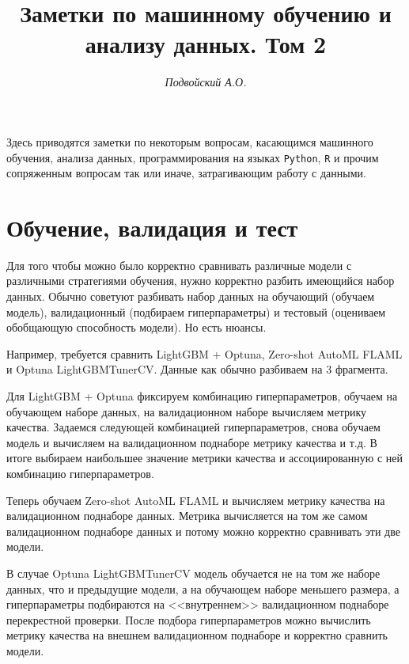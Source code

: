 \documentclass[%
	11pt,
	a4paper,
	utf8,
		]{article}
\begin{document}
\title{Заметки по машинному обучению и анализу данных. Том 2}

\author{\itshape Подвойский А.О.}

\date{}
\maketitle

\thispagestyle{fancy}

Здесь приводятся заметки по некоторым вопросам, касающимся машинного обучения, анализа данных, программирования на языках \texttt{Python}, \texttt{R} и прочим сопряженным вопросам так или иначе, затрагивающим работу с данными.



\tableofcontents

\section{Обучение, валидация и тест}

Для того чтобы можно было корректно сравнивать различные модели с различными стратегиями обучения, нужно корректно разбить имеющийся набор данных. Обычно советуют разбивать набор данных на обучающий (обучаем модель), валидационный (подбираем гиперпараметры) и тестовый (оцениваем обобщающую способность модели). Но есть нюансы.

Например, требуется сравнить LightGBM + Optuna, Zero-shot AutoML FLAML и Optuna LightGBMTunerCV. Данные как обычно разбиваем на 3 фрагмента. 

Для LightGBM + Optuna фиксируем комбинацию гиперпараметров, обучаем на обучающем наборе данных, на валидационном наборе вычисляем метрику качества. Задаемся следующей комбинацией гиперпараметров, снова обучаем модель и вычисляем на валидационном поднаборе метрику качества и т.д. В итоге выбираем наибольшее значение метрики качества и ассоциированную с ней комбинацию гиперпараметров.

Теперь обучаем Zero-shot AutoML FLAML и вычисляем метрику качества на валидационном поднаборе данных. Метрика вычисляется на том же самом валидационном поднаборе данных и потому можно корректно сравнивать эти две модели.

В случае Optuna LightGBMTunerCV модель обучается не на том же наборе данных, что и предыдущие модели, а на обучающем наборе меньшего размера, а гиперпараметры подбираются на <<внутреннем>> валидационном поднаборе перекрестной проверки. После подбора гиперпараметров можно вычислить метрику качества на внешнем валидационном поднаборе и корректно сравнить модели.
\end{document}
